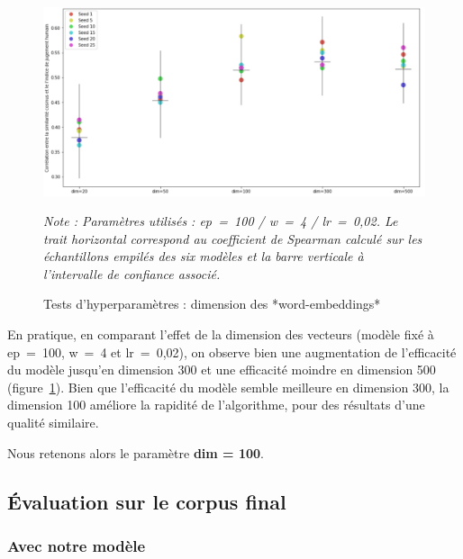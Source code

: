 \documentclass[11pt,french,french]{article}
\begin{document}
\begin{figure}
\begin{center}
\includegraphics[width=1\textwidth]{img/test_parametres2.png}
\captionsetup{margin=0cm,format=hang,justification=justified}
\caption{Tests d'hyperparamètres : dimension des *word-embeddings*}\label{fig:figure_dim}
\end{center}
\vspace{-0.3cm}
\footnotesize
\emph{Note : Paramètres utilisés : ep = 100 / w = 4 / lr = 0,02.\newline
Le trait horizontal correspond au coefficient de Spearman calculé sur les échantillons empilés des six modèles et la barre verticale à l'intervalle de confiance associé.}
\end{figure}

En pratique, en comparant l'effet de la dimension des vecteurs (modèle
fixé à ep~=~100, w~=~4 et lr~=~0,02), on observe bien une augmentation
de l'efficacité du modèle jusqu'en dimension 300 et une efficacité
moindre en dimension 500 (figure~\ref{fig:figure_dim}). Bien que
l'efficacité du modèle semble meilleure en dimension 300, la dimension
100 améliore la rapidité de l'algorithme, pour des résultats d'une
qualité similaire.

\faArrowCircleRight{} Nous retenons alors le paramètre \textbf{dim =
100}.

\subsection{Évaluation sur le corpus
final}\label{uxe9valuation-sur-le-corpus-final}

\subsubsection{\texorpdfstring{Avec \og notre \fg{}
modèle}{Avec notre  modèle}}\label{avec-notre-moduxe8le}
\end{document}
